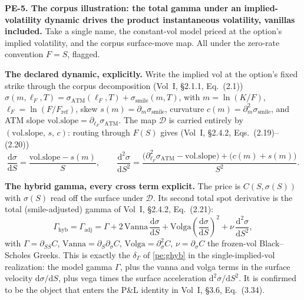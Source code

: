 \documentclass[11pt,a4paper]{article}
\newcommand{\pelabel}[1]{\leavevmode\hypertarget{pe-#1}{}%
  \marginpar{\raggedright\scriptsize\ttfamily\textcolor{gray}{#1}}}
\newcommand{\dd}{\mathrm{d}}
\newcommand{\Vanna}{\mathrm{Vanna}}
\newcommand{\Volga}{\mathrm{Volga}}
\newcommand{\Gadj}{\Gamma_{\mathrm{adj}}}
\newcommand{\Ghyb}{\Gamma_{\mathrm{hyb}}}
\newcommand{\satm}{\sigma_{\mathrm{ATM}}}
\newcommand{\ssm}{\sigma_{\mathrm{smile}}}
\newcommand{\lF}{\ell_F}
\newcommand{\Fref}{F_{\mathrm{ref}}}
\newcommand{\volslope}{\mathrm{vol.slope}}
\begin{document}
\pelabel{PE-5}\textbf{PE-5. The corpus illustration: the total gamma under an
implied-volatility dynamic drives the product instantaneous volatility,
vanillas included.} Take a single name, the constant-vol model priced at the
option's implied volatility, and the corpus surface-move map. All under the
zero-rate convention $F=S$, flagged.

\textbf{The declared dynamic, explicitly.} Write the implied vol at the option's
fixed strike through the corpus decomposition (Vol~I, \S2.1.1, Eq.~(2.1))
$\sigma(m,\lF,T) = \satm(\lF,T) + \ssm(m,T)$, with $m=\ln(K/F)$,
$\lF=\ln(F/\Fref)$, skew $s(m)=\partial_m\ssm$, curvature
$c(m)=\partial_m^2\ssm$, and ATM slope $\volslope=\partial_{\lF}\satm$. The map
$\mathcal{D}$ is carried entirely by $(\volslope,\,s,\,c)$: routing through
$F(S)$ gives (Vol~I, \S2.4.2, Eqs.~(2.19)--(2.20))
\begin{equation}\label{pe:dsig}
  \frac{\dd\sigma}{\dd S} = \frac{\volslope - s(m)}{S},
  \qquad
  \frac{\dd^2\sigma}{\dd S^2}
  = \frac{\bigl(\partial_{\lF}^2\satm - \volslope\bigr) + \bigl(c(m)+s(m)\bigr)}{S^2}.
\end{equation}

\textbf{The hybrid gamma, every cross term explicit.} The price is
$C(S,\sigma(S))$ with $\sigma(S)$ read off the surface under $\mathcal{D}$. Its
second total spot derivative is the total (smile-adjusted) gamma of Vol~I, \S2.4.2,
Eq.~(2.21):
\begin{equation}\label{pe:gadj}
  \Ghyb = \Gadj
  = \Gamma + 2\,\Vanna\,\frac{\dd\sigma}{\dd S}
    + \Volga\left(\frac{\dd\sigma}{\dd S}\right)^{\!2}
    + \nu\,\frac{\dd^2\sigma}{\dd S^2},
\end{equation}
with $\Gamma=\partial_{SS}C$, $\Vanna=\partial_S\partial_\sigma C$,
$\Volga=\partial_\sigma^2 C$, $\nu=\partial_\sigma C$ the frozen-vol
Black--Scholes Greeks. This is exactly the $\delta_\Gamma$ of
\eqref{pe:ghyb} in the single-implied-vol realization: the model gamma
$\Gamma$, plus the vanna and volga terms in the surface velocity
$\dd\sigma/\dd S$, plus vega times the surface acceleration $\dd^2\sigma/\dd
S^2$. It is confirmed to be the object that enters the P\&L identity in
Vol~I, \S3.6, Eq.~(3.34).
\end{document}
